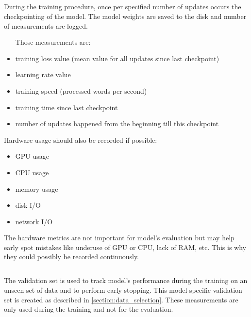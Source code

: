 \subsection{}


During the training procedure, once per specified number of updates
occurs the checkpointing of the model.
The model weights are saved to the disk and number of measurements are logged.

\begin{samepage}
\begin{itemize}
	\item [Those measurements are:]
	\item training loss value (mean value for all updates since
	last checkpoint)
	\item learning rate value
	\item training speed (processed words per second)
	\item training time since last checkpoint
	\item number of updates happened from the beginning till this checkpoint
\end{itemize}
\end{samepage}
\begin{samepage}
Hardware usage should also be recorded if possible:
\begin{itemize}
	\item GPU usage
	\item CPU usage
	\item memory usage
	\item disk I/O
	\item network I/O
\end{itemize}
\end{samepage}

The hardware metrics are not important for model's evaluation
but may help early spot mistakes like underuse of GPU or CPU, lack of RAM, etc.
This is why they could possibly be recorded continuously. 

\subsection{}
\label{subsection:validation}

The validation set is used to track model's performance during the training
on an unseen set of data and to perform early stopping.
This model-specific validation set is created as described
in \cref{section:data_selection}.
These measurements are only used during the training and not for the evaluation.

